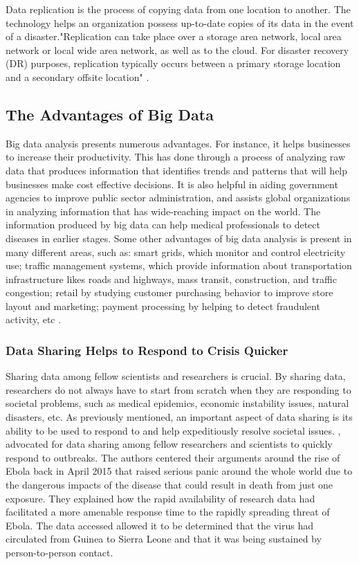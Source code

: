 \documentclass[sigconf]{acmart}
\begin{document}
Data replication is the process of copying data from one location to another. The technology helps an organization possess up-to-date copies of its data in the event of a disaster."Replication can take place over a storage area network, local area network or local wide area network, as well as to the cloud. For disaster recovery (DR) purposes, replication typically occurs between a primary storage location and a secondary offsite location" \cite{Datarep2017}.


\subsection{The Advantages of Big Data}

Big data analysis presents numerous advantages. For instance, it helps businesses to increase their productivity. This has done through a process of analyzing raw data that produces information that identifies trends and patterns that will help businesses make cost effective decisions. It is also helpful in aiding government agencies to improve public sector administration, and assists global organizations in analyzing information that has wide-reaching impact on the world. The information produced by big data can help medical professionals to detect diseases in earlier stages. Some other advantages of big data analysis is present in many different areas, such as:  smart grids, which monitor and control electricity use; traffic management systems, which provide information about transportation infrastructure likes roads and highways, mass transit, construction, and traffic congestion; retail by studying customer purchasing behavior to improve store layout and marketing; payment processing by helping to detect fraudulent activity, etc \cite{tene2012big}.

\subsubsection{Data Sharing Helps to Respond to Crisis Quicker}

Sharing data among fellow scientists and researchers is crucial. By sharing data, researchers do not always have to start from scratch when they are responding to societal problems, such as medical epidemics, economic instability issues, natural disasters, etc.  As previously mentioned, an important aspect of data sharing is its ability to be used to respond to and help expeditiously resolve societal issues. \cite{yozwiak2015data}, advocated for data sharing among fellow researchers and scientists to quickly respond to outbreaks. The authors centered their arguments around the rise of Ebola back in April 2015 that raised serious panic around the whole world due to the dangerous impacts of the disease that could result in death from just one exposure. They explained how the rapid availability of research data had facilitated a more amenable response time to the rapidly spreading threat of Ebola. The data accessed allowed it to be determined that the virus had circulated from Guinea to Sierra Leone and that it was being sustained by person-to-person contact. 
\end{document}
